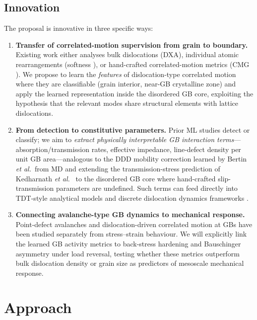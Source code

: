 \documentclass[11pt]{article}
\begin{document}
\subsection*{Innovation}
The proposal is innovative in three specific ways:

\begin{enumerate}[leftmargin=*]
\item \textbf{Transfer of correlated-motion supervision from grain to boundary.}
Existing work either analyses bulk dislocations (DXA), individual atomic rearrangements (softness \cite{Sharp2018}), or hand-crafted correlated-motion metrics (CMG \cite{Firman2024}).
We propose to learn the \emph{features} of dislocation-type correlated motion where they are classifiable (grain interior, near-GB crystalline zone) and apply the learned representation inside the disordered GB core, exploiting the hypothesis that the relevant modes share structural elements with lattice dislocations.

\item \textbf{From detection to constitutive parameters.}
Prior ML studies detect or classify; we aim to \emph{extract physically interpretable GB interaction terms}---absorption/transmission rates, effective impedance, line-defect density per unit GB area---analogous to the DDD mobility correction learned by Bertin \emph{et al.}\ from MD \cite{Bertin2024} and extending the transmission-stress prediction of Kedharnath \emph{et al.}\ \cite{Kedharnath2024} to the disordered GB core where hand-crafted slip-transmission parameters are undefined.
Such terms can feed directly into TDT-style analytical models \cite{Piao2022,LeBauschinger2018} and discrete dislocation dynamics frameworks \cite{Bertin2024}.

\item \textbf{Connecting avalanche-type GB dynamics to mechanical response.}
Point-defect avalanches \cite{Chesser2022} and dislocation-driven correlated motion at GBs \cite{Firman2024} have been studied separately from stress--strain behaviour.
We will explicitly link the learned GB activity metrics to back-stress hardening and Bauschinger asymmetry under load reversal, testing whether these metrics outperform bulk dislocation density or grain size as predictors of mesoscale mechanical response.
\end{enumerate}

\section*{Approach}
\end{document}
